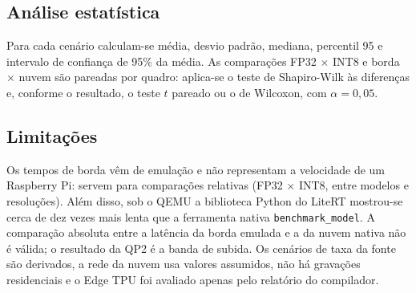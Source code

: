 \subsection{Análise estatística}
Para cada cenário calculam-se média, desvio padrão, mediana, percentil 95 e intervalo de confiança de
95\% da média. As comparações FP32 $\times$ INT8 e borda $\times$ nuvem são pareadas por quadro: aplica-se
o teste de Shapiro-Wilk às diferenças e, conforme o resultado, o teste $t$ pareado ou o de Wilcoxon,
com $\alpha = 0{,}05$.

\subsection{Limitações}
Os tempos de borda vêm de emulação e não representam a velocidade de um Raspberry Pi: servem para
comparações relativas (FP32 $\times$ INT8, entre modelos e resoluções). Além disso, sob o QEMU a
biblioteca Python do LiteRT mostrou-se cerca de dez vezes mais lenta que a ferramenta nativa
\texttt{benchmark\_model}. A comparação absoluta entre a latência da borda emulada e a da nuvem nativa
não é válida; o resultado da QP2 é a banda de subida. Os cenários de taxa da fonte são derivados, a
rede da nuvem usa valores assumidos, não há gravações residenciais e o Edge TPU foi avaliado apenas
pelo relatório do compilador.
